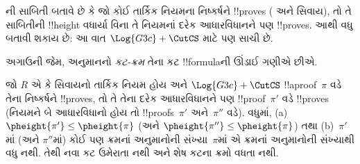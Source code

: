 \documentclass[../../../include/open-logic-section]{subfiles}
\begin{document}


ની સાબિતી બતાવે છે કે જો
 કોઈ તાર્કિક નિયમના નિષ્કર્ષને !!{prove}s
(\RightR{\lexists} અને \LeftR{\lforall} સિવાય), તો તે
સાબિતીની !!{height} વધાર્યા વિના તે નિયમનાં દરેક આધારવિધાનને
પણ !!{prove}s. આથી વધુ બતાવી શકાય છે: આ વાત
$\Log{G3c} + \CutCS$ માટે પણ સાચી છે.

અગાઉની જેમ, \CutCS{} અનુમાનનો \emph{કટ-ક્રમ} તેના
કટ !!{formula}ની ઊંડાઈ ગણીએ છીએ.

\begin{lem}
જો $R$ એ \RightR{\lexists} કે \LeftR{\lforall}
સિવાયનો તાર્કિક નિયમ હોય અને
$\Log{G3c} + \CutCS$ !!a{proof}~$\pi$ વડે તેના
નિષ્કર્ષને !!{prove}s, તો તે તેના દરેક આધારવિધાનને પણ
!!{proof}~$\pi'$ વડે !!{prove}s (નિયમને બે
આધારવિધાનો હોય તો !!{proof}s~$\pi'$ અને~$\pi''$ વડે).
વધુમાં, (a)~$\pheight{\pi'}\le\pheight{\pi}$
(અને $\pheight{\pi''}\le\pheight{\pi}$) તથા
(b)~$\pi'$માં (અને $\pi''$માં) કોઈ પણ ક્રમનાં
\CutCS{} અનુમાનોની સંખ્યા~$\pi$માં એ ક્રમનાં અનુમાનોની
સંખ્યાથી વધુ નથી. તેથી નવા કટ ઉમેરાતા નથી અને શેષ કટના
ક્રમો વધતા નથી.
\end{lem}
\end{document}
